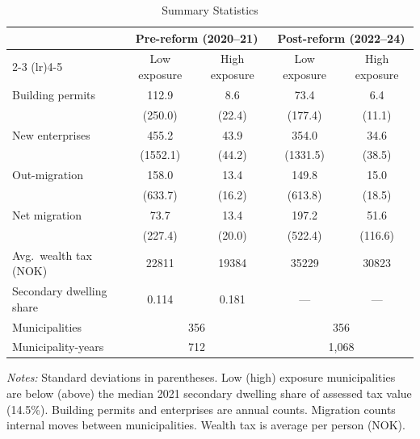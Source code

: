 \begin{table}[t]
\centering
\caption{Summary Statistics}
\label{tab:summary}
\begin{tabular}{lcccc}
\hline\hline
 & \multicolumn{2}{c}{Pre-reform (2020--21)} & \multicolumn{2}{c}{Post-reform (2022--24)} \\
\cmidrule(lr){2-3} \cmidrule(lr){4-5}
 & Low exposure & High exposure & Low exposure & High exposure \\
\hline
Building permits & 112.9 & 8.6 & 73.4 & 6.4 \\
 & (250.0) & (22.4) & (177.4) & (11.1) \\[3pt]
New enterprises & 455.2 & 43.9 & 354.0 & 34.6 \\
 & (1552.1) & (44.2) & (1331.5) & (38.5) \\[3pt]
Out-migration & 158.0 & 13.4 & 149.8 & 15.0 \\
 & (633.7) & (16.2) & (613.8) & (18.5) \\[3pt]
Net migration & 73.7 & 13.4 & 197.2 & 51.6 \\
 & (227.4) & (20.0) & (522.4) & (116.6) \\[3pt]
Avg.\ wealth tax (NOK) & 22811 & 19384 & 35229 & 30823 \\
Secondary dwelling share & 0.114 & 0.181 & --- & --- \\
\hline
Municipalities & \multicolumn{2}{c}{356} & \multicolumn{2}{c}{356} \\
Municipality-years & \multicolumn{2}{c}{712} & \multicolumn{2}{c}{1,068} \\
\hline\hline
\end{tabular}
\begin{minipage}{0.95\textwidth}
\vspace{0.3em}
\footnotesize \textit{Notes:} Standard deviations in parentheses. Low (high) exposure municipalities are below (above) the median 2021 secondary dwelling share of assessed tax value (14.5\%). Building permits and enterprises are annual counts. Migration counts internal moves between municipalities. Wealth tax is average per person (NOK).
\end{minipage}
\end{table}
